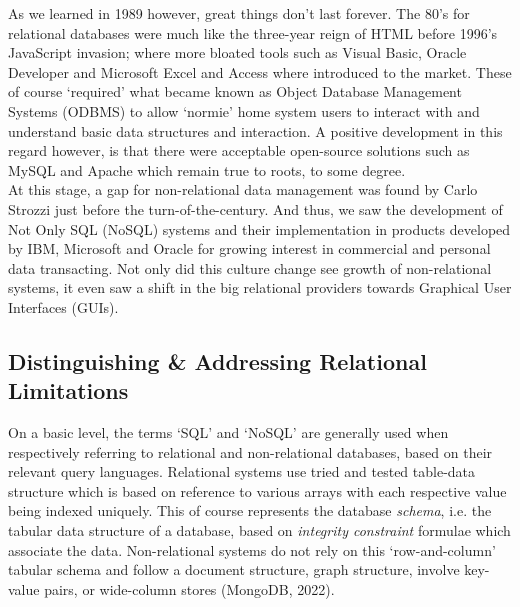 \documentclass[11pt, english]{article}
\begin{document}
	As we learned in 1989 however, great things don't last forever. The 80's for relational databases were much like the three-year reign of HTML before 1996's JavaScript invasion; where more bloated tools such as Visual Basic, Oracle Developer and Microsoft Excel and Access where introduced to the market. These of course `required' what became known as Object Database Management Systems (ODBMS) to allow `normie' home system users to interact with and understand basic data structures and interaction. A positive development in this regard however, is that there were acceptable open-source solutions such as MySQL and Apache which remain true to roots, to some degree.\\

	At this stage, a gap for non-relational data management was found by Carlo Strozzi just before the turn-of-the-century. And thus, we saw the development of Not Only SQL (NoSQL) systems and their implementation in products developed by IBM, Microsoft and Oracle for growing interest in commercial and personal data transacting. Not only did this culture change see growth of non-relational systems, it even saw a shift in the big relational providers towards Graphical User Interfaces (GUIs).

	\subsection{Distinguishing \& Addressing Relational Limitations}

	On a basic level, the terms `SQL' and `NoSQL' are generally used when respectively referring to relational and non-relational databases, based on their relevant query languages. Relational systems use tried and tested table-data structure which is based on reference to various arrays with each respective value being indexed uniquely. This of course represents the database \textit{schema}, i.e. the tabular data structure of a database, based on \textit{integrity constraint} formulae which associate the data. Non-relational systems do not rely on this `row-and-column' tabular schema and follow a document structure, graph structure, involve key-value pairs, or wide-column stores (MongoDB, 2022).\\
\end{document}

